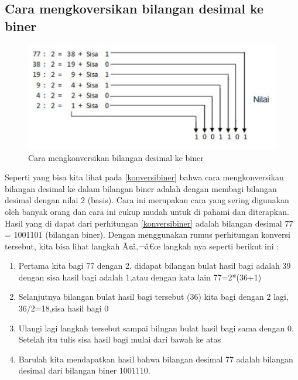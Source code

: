 \subsection{Cara mengkoversikan bilangan desimal ke biner}
\begin{figure}[ht]
\centerline{\includegraphics[width=1\textwidth]{figures/konversibiner.JPG}}
\caption{Cara mengkonversikan bilangan desimal ke biner}
\label{Contoh Konversi Bilangan Desimal}
\end{figure}
Seperti yang bisa kita lihat pada \ref{konversibiner} bahwa cara mengkonversikan bilangan desimal ke dalam bilangan biner adalah dengan membagi bilangan desimal dengan nilai 2 (basis). Cara ini merupakan cara yang sering digunakan oleh banyak orang dan cara ini cukup mudah untuk di pahami dan diterapkan. Hasil yang di dapat dari perhitungan \ref{konversibiner} adalah bilangan desimal 77 = 1001101 (bilangan biner). Dengan menggunakan rumus perhitungan konversi tersebut, kita bisa lihat langkah Ã¢â‚¬â€œ langkah nya seperti berikut ini : 
\begin{enumerate}
	\item Pertama kita bagi 77 dengan 2, didapat bilangan bulat hasil bagi adalah 39 dengan sisa hasil bagi adalah 1,atau dengan kata lain 77=2*(36+1)
	\item Selanjutnya bilangan bulat hasil bagi tersebut (36) kita bagi dengan 2 lagi, 36/2=18,sisa hasil bagi 0
	\item Ulangi lagi langkah tersebut sampai bilngan bulat hasil bagi sama dengan 0. Setelah itu tulis sisa hasil bagi mulai dari bawah ke atas
	\item Barulah kita mendapatkan hasil bahwa bilangan desimal 77 adalah bilangan desimal dari bilangan biner 1001110.
\end{enumerate}
